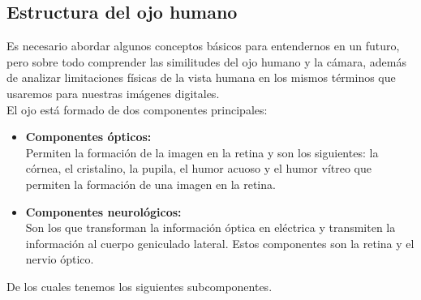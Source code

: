 \subsection{Estructura del ojo humano}
Es necesario abordar algunos conceptos básicos para entendernos en un
futuro, pero sobre todo comprender las similitudes del ojo humano y
la cámara, además de analizar limitaciones físicas de la vista humana
en los mismos términos que usaremos para nuestras imágenes digitales.\\
El ojo está formado de dos componentes principales:
\begin{itemize}
	\item \textbf{Componentes ópticos:} \\Permiten la formación de la imagen en la retina y son los
	      siguientes: la córnea, el cristalino, la pupila, el humor acuoso y el humor vítreo que
	      permiten la formación de una imagen en la retina.
	\item \textbf{Componentes neurológicos:}\\ Son los que transforman la información óptica en
	      eléctrica y transmiten la información al cuerpo geniculado lateral. Estos componentes
	      son la retina y el nervio óptico.
\end{itemize}
De los cuales tenemos los siguientes subcomponentes.
